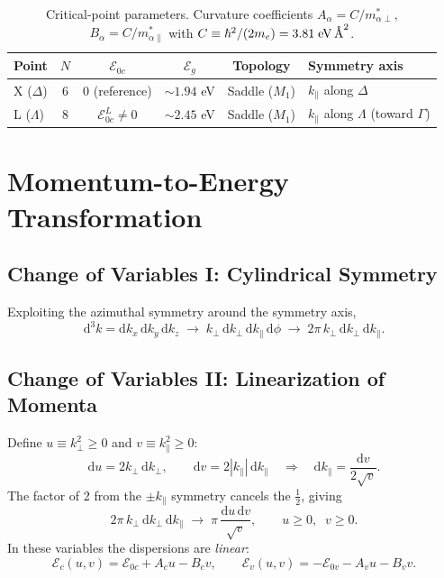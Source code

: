 \documentclass[11pt, a4paper]{article}
\newcommand{\E}{\mathcal{E}}
\newcommand{\Ec}{\E_c}
\newcommand{\Ev}{\E_v}
\newcommand{\Eoc}{\E_{0c}}
\newcommand{\Eov}{\E_{0v}}
\newcommand{\Eg}{\E_g}
\newcommand{\kperp}{k_{\!\perp}}
\newcommand{\kpar}{k_{\!\parallel}}
\newcommand{\dd}{\mathrm{d}}
\begin{document}
\begin{table}[ht]
    \centering
    \caption{Critical-point parameters. Curvature coefficients $A_\alpha = C / m^*_{\alpha\perp}$, $B_\alpha = C / m^*_{\alpha\parallel}$ with $C \equiv \hbar^2/(2m_e) = 3.81\;\text{eV\,\AA}^2$.}\label{tab:params}
    \smallskip
    \begin{tabular}{@{}lccccl@{}}
        \toprule
        Point & $N$ & $\Eoc$ & $\Eg$ & Topology & Symmetry axis \\
        \midrule
        X ($\Delta$) & 6 & $0$ (reference) & ${\sim}1.94$ eV & Saddle ($M_1$) & $\kpar$ along $\Delta$ \\
        L ($\Lambda$) & 8 & $\Eoc^L \neq 0$ & ${\sim}2.45$ eV & Saddle ($M_1$) & $\kpar$ along $\Lambda$ (toward $\Gamma$) \\
        \bottomrule
    \end{tabular}
\end{table}

\section{Momentum-to-Energy Transformation}

\subsection{Change of Variables I: Cylindrical Symmetry}

Exploiting the azimuthal symmetry around the symmetry axis,
\begin{equation}
    \dd^3 k = \dd k_x\,\dd k_y\,\dd k_z
    \;\longrightarrow\;
    \kperp\,\dd\kperp\,\dd\kpar\,\dd\phi
    \;\longrightarrow\;
    2\pi\,\kperp\,\dd\kperp\,\dd\kpar.
\end{equation}

\subsection{Change of Variables II: Linearization of Momenta}

Define $u \equiv \kperp^2 \geq 0$ and $v \equiv \kpar^2 \geq 0$:
\begin{equation}
    \dd u = 2\kperp\,\dd\kperp, \qquad
    \dd v = 2|\kpar|\,\dd\kpar
    \quad\Rightarrow\quad
    \dd\kpar = \frac{\dd v}{2\sqrt{v}}.
\end{equation}
The factor of 2 from the $\pm\kpar$ symmetry cancels the $\tfrac{1}{2}$, giving
\begin{equation}\label{eq:measure-uv}
    2\pi\,\kperp\,\dd\kperp\,\dd\kpar
    \;\longrightarrow\;
    \pi\,\frac{\dd u\,\dd v}{\sqrt{v}},
    \qquad u \geq 0,\;\; v \geq 0.
\end{equation}
In these variables the dispersions are \emph{linear}:
\begin{equation}\label{eq:lin-disp}
    \Ec(u,v) = \Eoc + A_c u - B_c v,
    \qquad
    \Ev(u,v) = -\Eov - A_v u - B_v v.
\end{equation}
\end{document}
